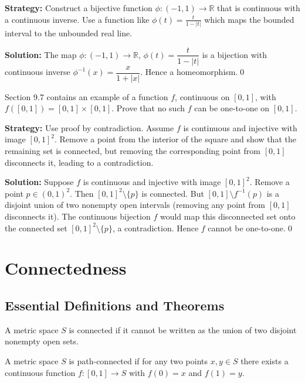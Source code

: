 \noindent\textbf{Strategy:} Construct a bijective function $\phi: (-1,1) \to \mathbb{R}$ that is continuous with a continuous inverse. Use a function like $\phi(t) = \frac{t}{1-|t|}$ which maps the bounded interval to the unbounded real line.

\bigskip\noindent\textbf{Solution:}
The map $\phi:(-1,1)\to\mathbb{R}$, $\phi(t)=\dfrac{t}{1-|t|}$ is a bijection with continuous inverse $\phi^{-1}(x)=\dfrac{x}{1+|x|}$. Hence a homeomorphism.\qed



\begin{problembox}
Section 9.7 contains an example of a function $f$, continuous on $[0, 1]$, with $f([0, 1]) = [0, 1] \times [0, 1]$. Prove that no such $f$ can be one-to-one on $[0, 1]$.
\end{problembox}

\noindent\textbf{Strategy:} Use proof by contradiction. Assume $f$ is continuous and injective with image $[0,1]^2$. Remove a point from the interior of the square and show that the remaining set is connected, but removing the corresponding point from $[0,1]$ disconnects it, leading to a contradiction.

\bigskip\noindent\textbf{Solution:}
Suppose $f$ is continuous and injective with image $[0,1]^2$. Remove a point $p\in(0,1)^2$. Then $[0,1]^2\setminus\{p\}$ is connected. But $[0,1]\setminus f^{-1}(p)$ is a disjoint union of two nonempty open intervals (removing any point from $[0,1]$ disconnects it). The continuous bijection $f$ would map this disconnected set onto the connected set $[0,1]^2\setminus\{p\}$, a contradiction. Hence $f$ cannot be one-to-one.\qed

\section{Connectedness}

\subsection*{Essential Definitions and Theorems}

\begin{definition}
A metric space $S$ is connected if it cannot be written as the union of two disjoint nonempty open sets.
\end{definition}

\begin{definition}
A metric space $S$ is path-connected if for any two points $x,y \in S$ there exists a continuous function $f: [0,1] \to S$ with $f(0) = x$ and $f(1) = y$.
\end{definition}


